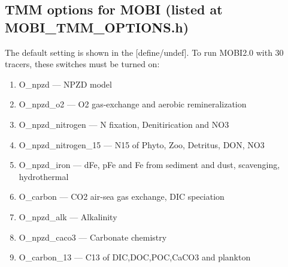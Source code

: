\documentclass[a4paper]{article}
\begin{document}
\subsection{TMM options for MOBI (listed at MOBI\_TMM\_OPTIONS.h)} \label{subsection:mobi_options}
The default setting is shown in the [define/undef]. To run MOBI2.0 with 30 tracers, these switches must be turned on:
\begin{enumerate}
\item O\_npzd --- NPZD model
\item O\_npzd\_o2 --- O2 gas-exchange and aerobic remineralization
\item O\_npzd\_nitrogen --- N fixation, Denitirication and NO3 
\item O\_npzd\_nitrogen\_15 --- N15 of Phyto, Zoo, Detritus, DON, NO3
\item O\_npzd\_iron --- dFe, pFe and Fe from sediment and dust, scavenging, hydrothermal
\item O\_carbon --- CO2 air-sea gas exchange, DIC speciation
\item O\_npzd\_alk --- Alkalinity
\item O\_npzd\_caco3 --- Carbonate chemistry
\item O\_carbon\_13 --- C13 of DIC,DOC,POC,CaCO3 and plankton
\end{enumerate}
\end{document}

